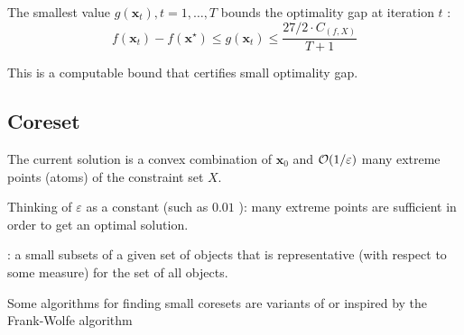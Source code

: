 The smallest value $g\left(\mathbf{x}_{t}\right), t=1, \ldots, T$ bounds the optimality gap at iteration $t$ :
$$
f\left(\mathbf{x}_{t}\right)-f\left(\mathbf{x}^{\star}\right) \leq g\left(\mathbf{x}_{t}\right) \leq \frac{27 / 2 \cdot C_{(f, X)}}{T+1}
$$

This is a computable bound that certifies small optimality gap.



\subsection*{Coreset}
The current solution is a convex combination of $\mathbf{x}_{0}$ and $\operatorname{\mathcal{O}}(1 / \varepsilon)$ many extreme points (atoms) of the constraint set $X$.

Thinking of $\varepsilon$ as a constant (such as $0.01$ ):  many extreme points are sufficient in order to get an  optimal solution.


: a small subsets of a given set of objects that is representative (with respect to some measure) for the set of all objects.

Some algorithms for finding small coresets are variants of or inspired by the
Frank-Wolfe algorithm







